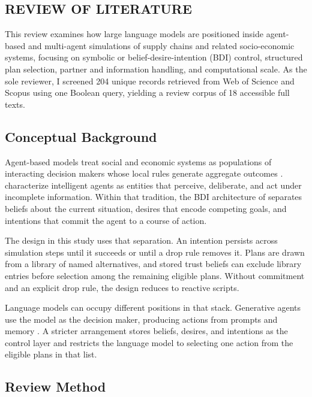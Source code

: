 \documentclass{icsthesis}
\begin{document}
\begin{mainmatter}
		\section{REVIEW OF LITERATURE}

			This review examines how large language models are positioned inside agent-based and multi-agent simulations of supply chains and related socio-economic systems, focusing on symbolic or belief-desire-intention (BDI) control, structured plan selection, partner and information handling, and computational scale. As the sole reviewer, I screened 204 unique records retrieved from Web of Science and Scopus using one Boolean query, yielding a review corpus of 18 accessible full texts.

			\subsection{Conceptual Background}

			Agent-based models treat social and economic systems as populations of interacting decision makers whose local rules generate aggregate outcomes \citep{MacalNorth2010}. \citet{WooldridgeJennings1995} characterize intelligent agents as entities that perceive, deliberate, and act under incomplete information. Within that tradition, the BDI architecture of \citet{RaoGeorgeff1995} separates beliefs about the current situation, desires that encode competing goals, and intentions that commit the agent to a course of action.

			The design in this study uses that separation. An intention persists across simulation steps until it succeeds or until a drop rule removes it. Plans are drawn from a library of named alternatives, and stored trust beliefs can exclude library entries before selection among the remaining eligible plans. Without commitment and an explicit drop rule, the design reduces to reactive scripts.

			Language models can occupy different positions in that stack. Generative agents use the model as the decision maker, producing actions from prompts and memory \citep{Park2023}. A stricter arrangement stores beliefs, desires, and intentions as the control layer and restricts the language model to selecting one action from the eligible plans in that list.

			\subsection{Review Method}


\end{mainmatter}
\end{document}

